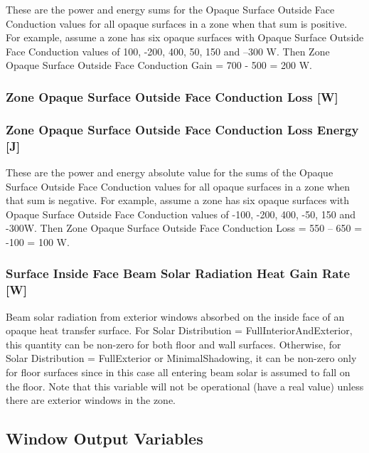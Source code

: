 These are the power and energy sums for the Opaque Surface Outside Face Conduction values for all opaque surfaces in a zone when that sum is positive. For example, assume a zone has six opaque surfaces with Opaque Surface Outside Face Conduction values of 100, -200, 400, 50, 150 and --300 W. Then Zone Opaque Surface Outside Face Conduction Gain = 700 - 500 = 200 W.

\subsubsection{Zone Opaque Surface Outside Face Conduction Loss {[}W{]}}\label{zone-opaque-surface-outside-face-conduction-loss-w}

\subsubsection{Zone Opaque Surface Outside Face Conduction Loss Energy {[}J{]}}\label{zone-opaque-surface-outside-face-conduction-loss-energy-j}

These are the power and energy absolute value for the sums of the Opaque Surface Outside Face Conduction values for all opaque surfaces in a zone when that sum is negative. For example, assume a zone has six opaque surfaces with Opaque Surface Outside Face Conduction values of -100, -200, 400, -50, 150 and -300W. Then Zone Opaque Surface Outside Face Conduction Loss = \textbar{}550 -- 650\textbar{} = \textbar{}-100\textbar{} = 100 W.

\subsubsection{Surface Inside Face Beam Solar Radiation Heat Gain Rate {[}W{]}}\label{surface-inside-face-beam-solar-radiation-heat-gain-rate-w}

Beam solar radiation from exterior windows absorbed on the inside face of an opaque heat transfer surface. For Solar Distribution = FullInteriorAndExterior, this quantity can be non-zero for both floor and wall surfaces. Otherwise, for Solar Distribution = FullExterior or MinimalShadowing, it can be non-zero only for floor surfaces since in this case all entering beam solar is assumed to fall on the floor. Note that this variable will not be operational (have a real value) unless there are exterior windows in the zone.

\subsection{Window Output Variables}\label{window-output-variables-1}

